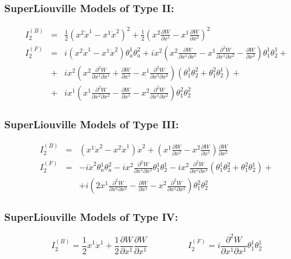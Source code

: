 \documentclass[a4paper,11pt,twoside]{article}
\begin{document}
\subsubsection{SuperLiouville Models of Type II:}
\begin{eqnarray*}
I_2^{(B)}& = & \frac{1}{2} \left(x^2 \dot{x}^1 - x^1 \dot{x}^2 \right)^2+ \frac{1}{2} \left(x^2 \frac{\partial W}{\partial x^1} - x^1 \frac{\partial W}{\partial x^2} \right)^2
\\
I_2^{(F)}&=& i \left( x^2 \dot{x}^1 - x^1 \dot{x}^2 \right)
\theta_a^1 \theta_a^2+i x^2 \left(x^2 \frac{\partial W}{\partial
x^1 \partial x^1}-x^1 \frac{\partial^2 W}{\partial x^1
\partial x^2}-\frac{\partial W}{\partial x^2}\right) \theta_1^1
\theta_2^1+ \\ & +& i x^2\left(x^2 \frac{\partial^2 W}{\partial
x^1 \partial x^1}+\frac{\partial W}{\partial x^1}-x^1
\frac{\partial^2 W}{\partial x^2 \partial x^2}\right)(\theta_1^1
\theta_2^2+\theta_1^2 \theta_2^1)+ \\ &+& i x^1 \left(x^1
\frac{\partial^2 W}{\partial x^2  \partial x^2}-\frac{\partial
W}{\partial x^1}-x^2 \frac{\partial^2 W}{\partial x^1 \partial
x^2}\right) \theta_1^2 \theta_2^2
\end{eqnarray*}

\subsubsection{SuperLiouville Models of Type III:}
\begin{eqnarray*}
I_2^{(B)}&=&\left(x^1 \dot{x}^2 - x^2 \dot{x}^1 \right) \dot{x}^2+
\left(x^1 \frac{\partial W}{\partial x^2} - x^2 \frac{\partial
W}{\partial x^1} \right)\frac{\partial W}{\partial x^2} \\
I_2^{(F)}&=&- i \dot{x}^2 \theta_a^1 \theta_a^2- i x^2
\frac{\partial^2 W}{\partial x^1 \partial x^2} \theta_1^1
\theta_2^1-i x^2 \frac{\partial^2 W}{\partial x^2 \partial x^2}
(\theta_1^1 \theta_2^2+\theta_1^2 \theta_2^1) +\\ & &+i\left(2 x^1
\frac{\partial^2 W}{\partial x^2 \partial x^2}-\frac{\partial
W}{\partial x^1}-x^2 \frac{\partial^2 W}{\partial x^1 \partial
x^2}\right) \theta_1^2 \theta_2^2
\end{eqnarray*}

\subsubsection{SuperLiouville Models of Type IV:}
\[
I_2^{(B)}= \frac{1}{2} \dot{x}^1 \dot{x}^1 +\frac{1}{2} \frac{\partial W}{\partial x^1} \frac{\partial W}{\partial x^1}  \hspace{2cm}
I_2^{(F)}=  i \frac{\partial^2 W}{\partial x^1 \partial x^1} \theta_1^1 \theta_2^1
\]
\end{document}
